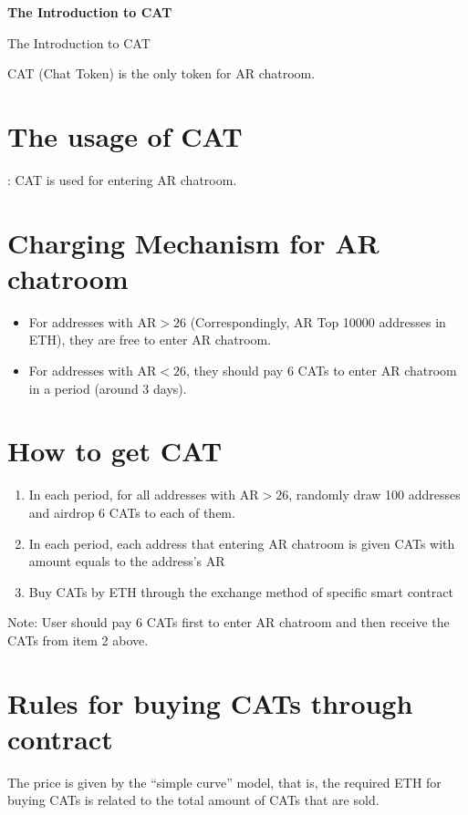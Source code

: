\documentclass[12pt]{article}
\begin{document}
\pagestyle{empty}

\pagecolor{\pcolor}
  \begin{center}
	\vspace*{0.5cm}
	\vspace{0.5cm}
	\textbf{\huge{The Introduction to CAT}}
	\vspace{0.5cm}
	\textbf{}
\end{center}
\setcounter{page}{0}
\pagestyle{fancy}
\vspace*{0.01cm}
The Introduction to CAT

CAT (Chat Token) is the only token for AR chatroom.

\section*{The usage of CAT}:
CAT	is used for entering AR chatroom. 

\section{Charging Mechanism for AR chatroom}
\begin{itemize}
\item For addresses with AR$>26$ (Correspondingly, AR Top 10000 addresses in ETH), they are free to enter AR chatroom. 
\item For addresses with AR$<26$, they should pay 6 CATs to enter AR chatroom in a period (around 3 days).
\end{itemize}
\section*{How to get CAT}
\begin{enumerate}
\item	In each period, for all addresses with AR$>26$, randomly draw 100 addresses and airdrop 6 CATs to each of them.
\item	In each period, each address that entering AR chatroom is given CATs with amount equals to the address’s AR
\item	Buy CATs by ETH through the exchange method of specific smart contract
\end{enumerate}
Note: User should pay 6 CATs first to enter AR chatroom and then receive the CATs from item 2 above.

\section*{Rules for buying CATs through contract}
The price is given by the “simple curve” model, that is, the required ETH for buying CATs is related to the total amount of CATs that are sold.
\end{document}
